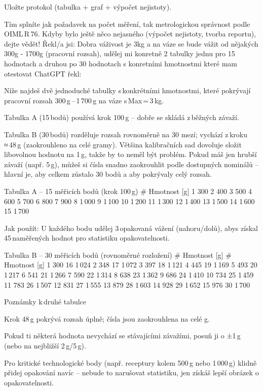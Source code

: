     Uložte protokol (tabulka + graf + výpočet nejistoty).

Tím splníte jak požadavek na počet měření, tak metrologickou správnost podle OIML R 76. Kdyby bylo ještě něco nejasného (výpočet nejistoty, tvorba reportu), dejte vědět!
Řekl/a jsi:
Dobra váživost je 3kg a na váze se bude vážit od nějakých 300g - 1700g (pracovní rozsah), udělej mi konretně 2 tabulky jednu pro 15 hodnotach a druhou po 30 hodnotach s konretními hmotnostmi které mam otestovat
ChatGPT řekl:

Níže najdeš dvě jednoduché tabulky s konkrétními hmotnostmi, které pokrývají pracovní rozsah 300 g – 1 700 g na váze s Max = 3 kg.

    Tabulka A (15 bodů) používá krok 100 g – dobře se skládá z běžných závaží.

    Tabulka B (30 bodů) rozděluje rozsah rovnoměrně na 30 mezí; vychází z kroku ≈ 48 g (zaokrouhleno na celé gramy). Většina kalibračních sad dovoluje složit libovolnou hodnotu na 1 g, takže by to neměl být problém. Pokud máš jen hrubší závaží (např. 5 g), můžeš si čísla snadno zaokrouhlit podle dostupných nominálů – hlavní je, aby celkem zůstalo 30 bodů a aby pokrývaly celý rozsah.

Tabulka A – 15 měřicích bodů (krok 100 g)
#	Hmotnost [g]
1	300
2	400
3	500
4	600
5	700
6	800
7	900
8	1 000
9	1 100
10	1 200
11	1 300
12	1 400
13	1 500
14	1 600
15	1 700

    Jak použít:
    U každého bodu udělej 3 opakovaná vážení (nahoru/dolů), abys získal 45 naměřených hodnot pro statistiku opakovatelnosti.

Tabulka B – 30 měřicích bodů (rovnoměrné rozložení)
#	Hmotnost [g]		#	Hmotnost [g]
1	300		16	1 024
2	348		17	1 072
3	397		18	1 121
4	445		19	1 169
5	493		20	1 217
6	541		21	1 266
7	590		22	1 314
8	638		23	1 362
9	686		24	1 410
10	734		25	1 459
11	783		26	1 507
12	831		27	1 555
13	879		28	1 603
14	928		29	1 652
15	976		30	1 700

    Poznámky k druhé tabulce

        Krok 48 g pokrývá rozsah úplně; čísla jsou zaokrouhlena na celé g.

        Pokud ti některá hodnota nevychází se stávajícími závažími, posuň ji o ±1 g (nebo na nejbližší 2 g/5 g).

        Pro kritické technologické body (např. receptury kolem 500 g nebo 1 000 g) klidně přidej opakování navíc – nebude to narušovat statistiku, jen získáš lepší obrázek o opakovatelnosti.

